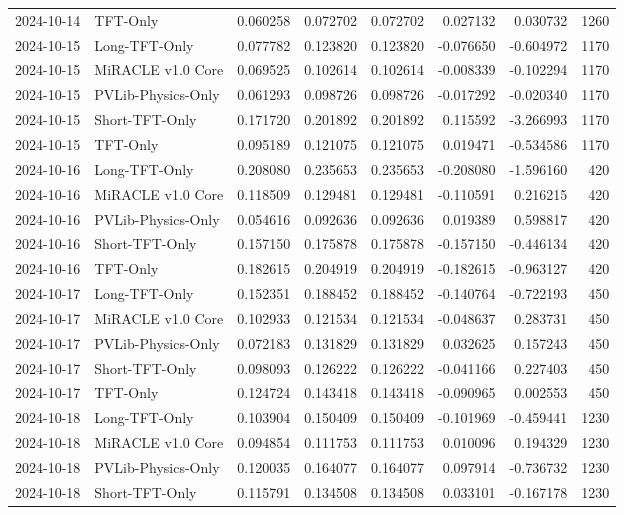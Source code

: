 \begin{tabular}{llrrrrrr}
2024-10-14 & TFT-Only & 0.060258 & 0.072702 & 0.072702 & 0.027132 & 0.030732 & 1260 \\
2024-10-15 & Long-TFT-Only & 0.077782 & 0.123820 & 0.123820 & -0.076650 & -0.604972 & 1170 \\
2024-10-15 & MiRACLE v1.0 Core & 0.069525 & 0.102614 & 0.102614 & -0.008339 & -0.102294 & 1170 \\
2024-10-15 & PVLib-Physics-Only & 0.061293 & 0.098726 & 0.098726 & -0.017292 & -0.020340 & 1170 \\
2024-10-15 & Short-TFT-Only & 0.171720 & 0.201892 & 0.201892 & 0.115592 & -3.266993 & 1170 \\
2024-10-15 & TFT-Only & 0.095189 & 0.121075 & 0.121075 & 0.019471 & -0.534586 & 1170 \\
2024-10-16 & Long-TFT-Only & 0.208080 & 0.235653 & 0.235653 & -0.208080 & -1.596160 & 420 \\
2024-10-16 & MiRACLE v1.0 Core & 0.118509 & 0.129481 & 0.129481 & -0.110591 & 0.216215 & 420 \\
2024-10-16 & PVLib-Physics-Only & 0.054616 & 0.092636 & 0.092636 & 0.019389 & 0.598817 & 420 \\
2024-10-16 & Short-TFT-Only & 0.157150 & 0.175878 & 0.175878 & -0.157150 & -0.446134 & 420 \\
2024-10-16 & TFT-Only & 0.182615 & 0.204919 & 0.204919 & -0.182615 & -0.963127 & 420 \\
2024-10-17 & Long-TFT-Only & 0.152351 & 0.188452 & 0.188452 & -0.140764 & -0.722193 & 450 \\
2024-10-17 & MiRACLE v1.0 Core & 0.102933 & 0.121534 & 0.121534 & -0.048637 & 0.283731 & 450 \\
2024-10-17 & PVLib-Physics-Only & 0.072183 & 0.131829 & 0.131829 & 0.032625 & 0.157243 & 450 \\
2024-10-17 & Short-TFT-Only & 0.098093 & 0.126222 & 0.126222 & -0.041166 & 0.227403 & 450 \\
2024-10-17 & TFT-Only & 0.124724 & 0.143418 & 0.143418 & -0.090965 & 0.002553 & 450 \\
2024-10-18 & Long-TFT-Only & 0.103904 & 0.150409 & 0.150409 & -0.101969 & -0.459441 & 1230 \\
2024-10-18 & MiRACLE v1.0 Core & 0.094854 & 0.111753 & 0.111753 & 0.010096 & 0.194329 & 1230 \\
2024-10-18 & PVLib-Physics-Only & 0.120035 & 0.164077 & 0.164077 & 0.097914 & -0.736732 & 1230 \\
2024-10-18 & Short-TFT-Only & 0.115791 & 0.134508 & 0.134508 & 0.033101 & -0.167178 & 1230 \\

\end{tabular}
